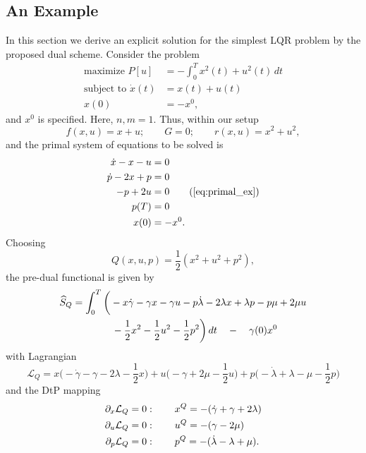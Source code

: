 \documentclass[11pt]{article}
\newcommand{\half}{\frac{1}{2}}
\newcommand{\p}{\partial}
\newcommand{\scl}{\mathcal{L}}
\begin{document}
\subsection{An Example}
In this section we derive an explicit solution for the simplest LQR problem by the proposed dual scheme. Consider the problem
\begin{equation*}
    \begin{aligned}
        \mbox{maximize } P[u] & = - \int_0^T x^2(t) + u^2(t) \, dt \\
        \mbox{subject to } \dot{x}(t) & = x(t) + u(t) \\
         x(0) & = - x^0,     
    \end{aligned}
\end{equation*}
and $x^0$ is specified. Here, $n,m = 1$.
Thus, within our setup
\[
f(x,u) = x + u; \qquad G = 0; \qquad r(x,u) = x^2 + u^2,
\]
and the primal system of equations to be solved is
\begin{subequations}\label{eq:primal_ex}
    \begin{align}
        \dot{x} - x - u & = 0 \notag\\
        \dot{p} - 2x + p & = 0 \notag\\
        - p + 2 u & = 0 \tag{\ref{eq:primal_ex}}\\
        p(T) & = 0 \notag\\
        x(0) & = - x^0. \notag
    \end{align}
\end{subequations}
Choosing
\[
Q(x,u,p) = \half (x^2 + u^2 + p^2),
\]
the pre-dual functional is given by
\begin{subequations}
    \begin{align}
        \widehat{S}_Q & = \int_0^T \bigg( - x \dot{\gamma} - \gamma x - \gamma u 
                    - p \dot{\lambda} - 2 \lambda x + \lambda p - p \mu + 2 \mu u \notag\\
                      & \qquad \qquad - \half x^2 - \half u^2 - \half p^2 \bigg) \, dt \quad - \quad \gamma(0) x^0 \notag
    \end{align}
\end{subequations}
with Lagrangian
\[
\scl_Q = x \bigg(- \dot{\gamma} - \gamma - 2 \lambda - \half x \bigg) + u \bigg( - \gamma + 2 \mu - \half u \bigg) + p \bigg( - \dot{\lambda} + \lambda - \mu - \half p \bigg)
\]
and the DtP mapping
\begin{subequations}
    \begin{align}
        \p_x \scl_Q & = 0 : \qquad x^Q = - (\dot{\gamma} + \gamma + 2 \lambda) \notag\\
        \p_u \scl_Q & = 0:  \qquad u^Q = -(\gamma - 2 \mu) \notag\\
        \p_p \scl_Q & = 0: \qquad p^Q = -(\dot{\lambda} - \lambda + \mu). \notag
    \end{align}
\end{subequations}
\end{document}
